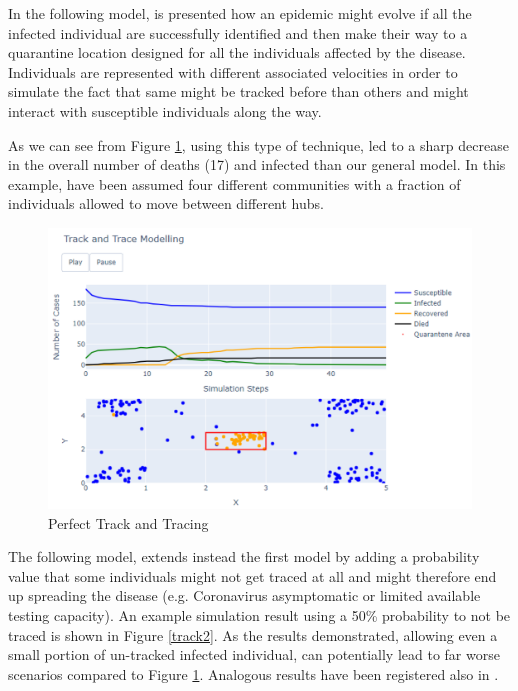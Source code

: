 In the following model, is presented how an epidemic might evolve if all the infected individual are successfully identified and then make their way to a quarantine location designed for all the individuals affected by the disease. Individuals are represented with different associated velocities in order to simulate the fact that same might be tracked before than others and might interact with susceptible individuals along the way.

As we can see from Figure \ref{track1}, using this type of technique, led to a sharp decrease in the overall number of deaths (17) and infected than our general model. In this example, have been assumed four different communities with a fraction of individuals allowed to move between different hubs. 
\begin{figure}[ht!]%
    \centering
    \includegraphics[width=0.85\linewidth]{latex/images/track1.pdf}
    \vspace{-0.3cm}
    \caption{Perfect Track and Tracing}
    \label{track1}
\end{figure}
\vspace{-0.3cm}

The following model, extends instead the first model by adding a probability value that some individuals might not get traced at all and might therefore end up spreading the disease (e.g. Coronavirus asymptomatic or limited available testing capacity). An example simulation result using a 50\% probability to not be traced is shown in Figure \ref{track2}. As the results demonstrated, allowing even a small portion of un-tracked infected individual, can potentially lead to far worse scenarios compared to Figure \ref{track1}. Analogous results have been registered also in \cite{epic}.

